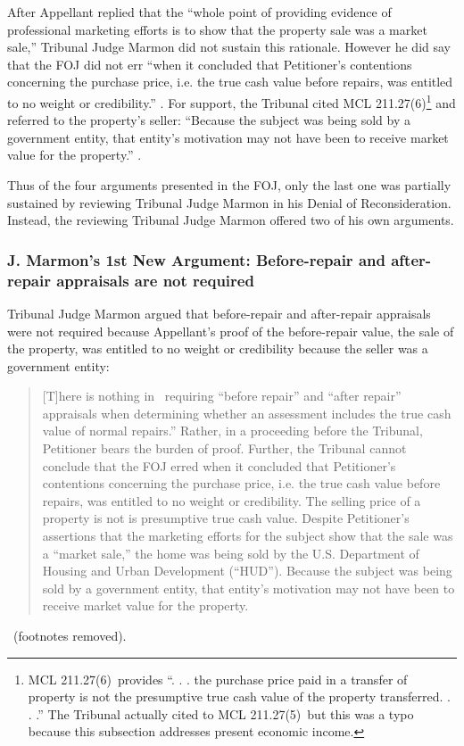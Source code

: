\documentclass[12pt,\documentclassflag]{michiganCourtOfAppealsBrief}
\begin{document}
After Appellant replied that the ``whole point of providing evidence of professional marketing efforts is to show that the property sale was a market sale,'' Tribunal Judge Marmon did not sustain this rationale. However he did say that the FOJ did not err ``when it concluded that Petitioner's contentions concerning the purchase price, i.e. the true cash value before repairs, was entitled to no weight or credibility.'' .
  For support, the Tribunal cited MCL 211.27(6)\footnote{MCL 211.27(6)\ provides ``. . . the purchase price paid in a transfer of property is not the presumptive true cash value of the property transferred. . . .'' The Tribunal actually cited to MCL 211.27(5)\ but this was a typo because this subsection addresses present economic income.} and referred to the property's seller:
``Because the subject was being sold by a government entity, that entity's motivation may
not have been to receive market value for the property.''
.

Thus of the four arguments presented in the FOJ, only the last one was partially sustained by reviewing Tribunal Judge Marmon in his Denial of Reconsideration. Instead, the reviewing Tribunal Judge Marmon offered two of his own arguments.

\subsubsection{J. Marmon's 1st New Argument: Before-repair and after-repair appraisals are not required}

Tribunal Judge Marmon argued that before-repair and after-repair appraisals were not required because Appellant's proof of the before-repair value, the sale of the property, was entitled to no weight or credibility because the seller was a government entity:

\begin{quote}
  [T]here is nothing in \mathieuGast\ requiring ``before repair'' and ``after repair'' appraisals when determining whether an assessment includes the true cash value of normal repairs.'' Rather, in a proceeding before the Tribunal, Petitioner bears the burden of proof. Further, the Tribunal cannot conclude that the FOJ erred when it
concluded that Petitioner's contentions concerning the purchase price, i.e. the true cash
value before repairs, was entitled to no weight or credibility. The selling price of a
property is not is presumptive true cash value. Despite Petitioner's assertions that the
marketing efforts for the subject show that the sale was a ``market sale,'' the home was
being sold by the U.S. Department of Housing and Urban Development (``HUD'').
Because the subject was being sold by a government entity, that entity's motivation may
not have been to receive market value for the property.
\end{quote}
\ (footnotes removed).
\end{document}
